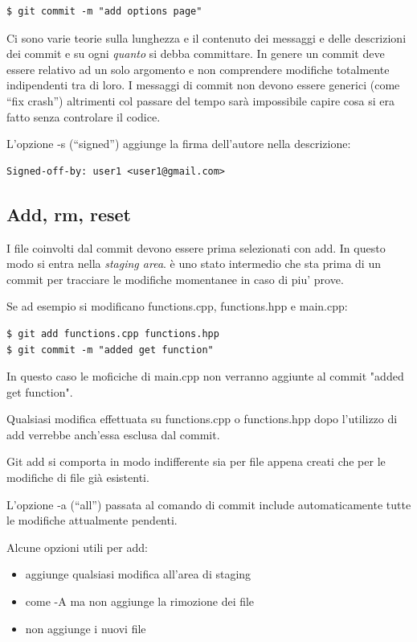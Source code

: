 \documentclass{article} \usepackage[textwidth=18cm,textheight=18cm]{geometry}
\begin{document}
\begin{verbatim}
$ git commit -m "add options page"
\end{verbatim}

Ci sono varie teorie  sulla lunghezza e il contenuto dei messaggi e delle
descrizioni dei commit e su ogni \emph{quanto} si debba committare. In genere un
commit deve essere relativo ad un solo argomento e non comprendere modifiche
totalmente indipendenti tra di loro. I messaggi di commit non devono essere
generici (come ``fix crash'') altrimenti col passare del tempo sarà impossibile
capire cosa si era fatto senza controlare il codice.

L'opzione -s (``signed'') aggiunge la firma dell'autore nella descrizione:

\begin{verbatim}
Signed-off-by: user1 <user1@gmail.com>
\end{verbatim}

\subsection{Add, rm, reset}

I file coinvolti dal commit devono essere prima selezionati con add. In questo
modo si entra nella \textit{staging area}. è uno stato intermedio che sta prima di
un commit per tracciare le modifiche momentanee in caso di piu' prove.

Se ad esempio si modificano functions.cpp, functions.hpp e main.cpp:

\begin{verbatim}
$ git add functions.cpp functions.hpp
$ git commit -m "added get function"
\end{verbatim}

In questo caso le moficiche di main.cpp non verranno aggiunte al commit "added
get function".

Qualsiasi modifica effettuata su functions.cpp o functions.hpp dopo l'utilizzo
di add verrebbe anch'essa esclusa dal commit.

Git add si comporta in modo indifferente sia per file appena creati che per le
modifiche di file già esistenti.

L'opzione -a (``all'') passata al comando di commit include automaticamente tutte
le modifiche attualmente pendenti.

Alcune opzioni utili per add:

\begin{itemize}
    \item {} aggiunge qualsiasi modifica all'area di staging
    \item {} come -A ma non aggiunge la rimozione dei file
    \item {} non aggiunge i nuovi file
\end{itemize}
\end{document}
